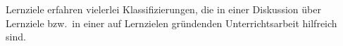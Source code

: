 Lernziele erfahren vielerlei Klassifizierungen, die in einer
Diskussion \"{u}ber Lernziele bzw.\ in einer auf Lernzielen
gr\"{u}ndenden Unterrichtsarbeit hilfreich sind.

%
%

\bip\bip
